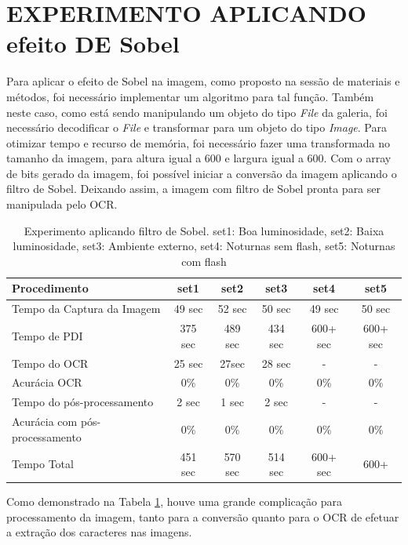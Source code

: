 \section{EXPERIMENTO APLICANDO efeito DE Sobel}

Para aplicar o efeito de Sobel na imagem, como proposto na sessão de materiais e métodos, foi necessário implementar um algoritmo para tal função. Também neste caso, como está sendo manipulando um objeto do tipo \textit{File} da galeria, foi necessário decodificar o \textit{File} e transformar para um objeto do tipo \textit{Image}. Para otimizar tempo e recurso de memória, foi necessário fazer uma transformada no tamanho da imagem, para altura igual a 600 e largura igual a 600. Com o array de bits gerado da imagem, foi possível iniciar a conversão da imagem aplicando o filtro de Sobel. Deixando assim, a imagem com filtro de Sobel pronta para ser manipulada pelo OCR. 

\begin{table}[]

\centering
\begin{tabular}{lccccc}
\hline
Procedimento & set1 & set2 & set3 & set4 & set5 \\ \hline
Tempo da Captura da Imagem & 49 sec & 52 sec & 50 sec & 49 sec & 50 sec \\
Tempo de PDI & 375 sec & 489 sec & 434 sec & 600+ sec & 600+ sec \\
Tempo do OCR & 25 sec & 27sec & 28 sec & - & - \\
Acurácia OCR & 0\% & 0\% & 0\% & 0\% & 0\% \\
Tempo do pós-processamento & 2 sec & 1 sec & 2 sec & - & - \\
Acurácia com pós-processamento & 0\% & 0\% & 0\% & 0\% & 0\% \\
Tempo Total & 451 sec & 570 sec & 514 sec & 600+ sec & 600+ \\ \hline
\end{tabular}
\caption{Experimento aplicando filtro de Sobel. set1: Boa luminosidade, set2: Baixa luminosidade, set3: Ambiente externo, set4: Noturnas sem flash, set5: Noturnas com flash}
\label{tab:exp_sobel}
\end{table}







Como demonstrado na Tabela \ref{tab:exp_sobel}, houve uma grande complicação para processamento da imagem, tanto para a conversão quanto para o OCR de efetuar a extração dos caracteres nas imagens.

